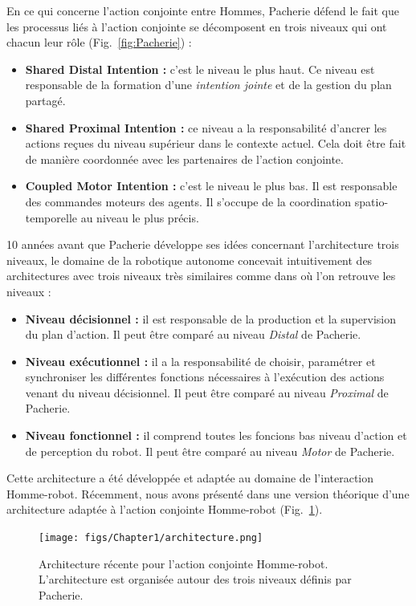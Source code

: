 \documentclass[english,a4paper,11pt,twoside]{StyleThese}
\begin{document}
En ce qui concerne l'action conjointe entre Hommes, Pacherie \cite{pacherie2011phenomenology} défend le fait que les processus liés à l'action conjointe se décomposent en trois niveaux qui ont chacun leur rôle  (Fig.~\ref{fig:Pacherie}) :
\begin{itemize}
\item \textbf{Shared Distal Intention :} c'est le niveau le plus haut. Ce niveau est responsable de la formation d'une \textit{intention jointe} et de la gestion du plan partagé.
\item \textbf{Shared Proximal Intention :} ce niveau a la responsabilité d'ancrer les actions reçues du niveau supérieur dans le contexte actuel. Cela doit être fait de manière coordonnée avec les partenaires de l'action conjointe.
\item \textbf{Coupled Motor Intention :} c'est le niveau le plus bas. Il est responsable des commandes moteurs des agents. Il s'occupe de la coordination spatio-temporelle au niveau le plus précis.
\end{itemize}

10 années avant que Pacherie développe ses idées concernant l'architecture trois niveaux, le domaine de la robotique autonome concevait intuitivement des architectures avec trois niveaux très similaires comme dans \cite{alami1998architecture} où l'on retrouve les niveaux :
\begin{itemize}
\item \textbf{Niveau décisionnel :} il est responsable de la production et la supervision du plan d'action. Il peut être comparé au niveau \textit{Distal} de Pacherie.
\item \textbf{Niveau exécutionnel :} il a la responsabilité de choisir, paramétrer et synchroniser les différentes fonctions nécessaires à l’exécution des actions venant du niveau décisionnel. Il peut être comparé au niveau \textit{Proximal} de Pacherie.
\item \textbf{Niveau fonctionnel :} il comprend toutes les foncions bas niveau d'action et de perception du robot. Il peut être comparé au niveau \textit{Motor} de Pacherie.
\end{itemize}

Cette architecture a été développée et adaptée au domaine de l'interaction Homme-robot. Récemment, nous avons présenté dans \cite{devin2016some} une version théorique d'une architecture adaptée à l'action conjointe Homme-robot (Fig.~\ref{fig:ArchiThreeLevels}).

\begin{figure}[!h]
	\centering
    \texttt{[image: figs/Chapter1/architecture.png]}
    \caption{Architecture récente pour l'action conjointe Homme-robot. L'architecture est organisée autour des trois niveaux définis par Pacherie.}
    \label{fig:ArchiThreeLevels}
\end{figure}
\end{document}
